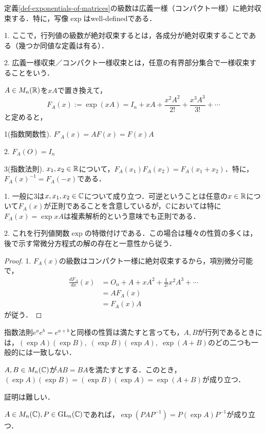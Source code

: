 \documentclass[uplatex,dvipdfmx]{jsreport}
\begin{document}
\begin{theorem}
    定義\ref{def-exponentials-of-matrices}の級数は広義一様（コンパクト一様）に絶対収束する．特に，写像$\exp$はwell-definedである．
\end{theorem}
\begin{remark}
    1. ここで，行列値の級数が絶対収束するとは，各成分が絶対収束することである（幾つか同値な定義は有る）．

    2. 広義一様収束／コンパクト一様収束とは，任意の有界部分集合で一様収束することをいう．
\end{remark}
\begin{theorem}[複素指数写像の特徴付け]\label{thm-characteristcs-exponentials}
    $A\in M_n(\mathbb{R})$を$xA$で置き換えて，
    \[ F_A(x):=\exp(xA)=I_n+xA+\frac{x^2A^2}{2!}+\frac{x^3A^3}{3!}+\cdots \]
    と定めると，

    1(指数関数性). $F'_A(x)=AF(x)=F(x)A$

    2. $F_A(O)=I_n$

    3(指数法則). $x_1,x_2\in\mathbb{R}$について，$F_A(x_1)F_A(x_2)=F_A(x_1+x_2)$．特に，$F_A(x)^{-1}=F_A(-x)$である．
\end{theorem}
\begin{remark}
    1. 一般に3は$x,x_1,x_2\in\mathbb{C}$について成り立つ．可逆ということは任意の$x\in\mathbb{R}$について$F_A(x)$が正則であることを含意しているが，$\mathbb{C}$においては特に$F_A(x)=\exp xA$は複素解析的という意味でも正則である．

    2. これを行列値関数$\exp$の特徴付けである．この場合は種々の性質の多くは，後で示す常微分方程式の解の存在と一意性から従う．
\end{remark}
\begin{proof}
    1. $F_A(x)$の級数はコンパクト一様に絶対収束するから，項別微分可能で，
    \begin{align*}
        \frac{dF_A}{dx}(x) &= O_n + A + xA^2 + \frac{1}{2!}x^2A^3 + \cdots\\
        &= AF_A(x)\\
        &= F_A(x)A
    \end{align*}
    が従う．
\end{proof}

指数法則$e^ae^b=e^{a+b}$と同様の性質は満たすと言っても，$A,B$が行列であるときには，$(\exp A)(\exp B),\;(\exp B)(\exp A),\;\exp(A+B)$のどの二つも一般的には一致しない．
\begin{proposition}
    $A,B\in M_n(\mathbb{C})$が$AB=BA$を満たすとする．このとき，$(\exp A)(\exp B)=(\exp B)(\exp A)=\exp(A+B)$が成り立つ．
\end{proposition}
証明は難しい．
\begin{proposition}
    $A\in M_n(\mathbb{C}),P\in\mathrm{GL}_n(\mathbb{C})$であれば，$\exp(PAP^{-1})=P(\exp A)P^{-1}$が成り立つ．
\end{proposition}
\end{document}

